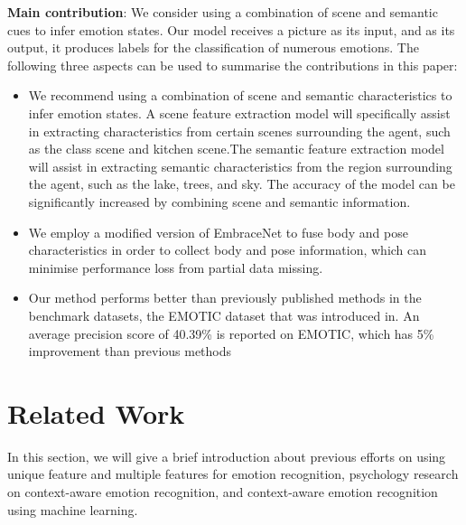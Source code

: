 \documentclass[conference]{IEEEtran}
\begin{document}
 \textbf{Main contribution}: We consider using a combination of scene and semantic cues to infer emotion states. Our model receives a picture as its input, and as its output, it produces labels for the classification of numerous emotions. The following three aspects can be used to summarise the contributions in this paper:

\begin{itemize}
  \item 
   We recommend using a combination of scene and semantic characteristics to infer emotion states. A scene feature extraction model will specifically assist in extracting characteristics from certain scenes surrounding the agent, such as the class scene and kitchen scene.The semantic feature extraction model will assist in extracting semantic characteristics from the region surrounding the agent, such as the lake, trees, and sky. The accuracy of the model can be significantly increased by combining scene and semantic information.\\
  
 \item 
 We employ a modified version of EmbraceNet \cite{ref-41}  to fuse body and pose characteristics in order to collect body and pose information, which can minimise performance loss from partial data missing.\\
 
 \item 
Our method performs better than previously published methods in the benchmark datasets, the EMOTIC dataset that was introduced in\cite{ref-5}. An average precision score of 40.39\% is reported on EMOTIC, which has 5\% improvement than previous methods \cite{ref-21}
\end{itemize}

\section{Related Work}
\label{sec:related_work}

In this section, we will give a brief introduction about previous efforts on using unique feature and multiple features for emotion recognition, psychology research on context-aware emotion recognition, and context-aware emotion recognition using machine learning.
\end{document}
